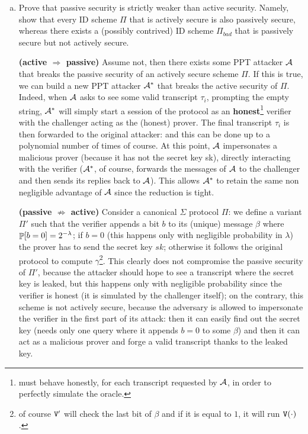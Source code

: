 \begin{enumerate}[(a)]
	\item Prove that passive security is strictly weaker than active security. Namely, show that every ID scheme $\Pi$ that is actively secure is also passively secure, whereas there exists a (possibly contrived) ID scheme $\Pi_{bad}$ that is passively secure but not actively secure.
	
	\begin{solution}
		\textbf{(active $\Rightarrow$ passive)} Assume not, then there exists some PPT attacker $\attacker$ that breaks the passive security of an actively secure scheme $\Pi$. If this is true, we can build a new PPT attacker $\newattacker$ that breaks the active security of $\Pi$. Indeed, when $\attacker$ asks to see some valid transcript $\tau_i$, prompting the empty string, $\newattacker$ will simply start a session of the protocol as an \textbf{honest}\footnote{must behave honestly, for each transcript requested by $\attacker$, in order to perfectly simulate the oracle.} verifier with the challenger acting as the (honest) prover. The final transcript $\tau_i$ is then forwarded to the original attacker: and this can be done up to a polynomial number of times of course. At this point, $\attacker$ impersonates a malicious prover (because it has not the secret key sk), directly interacting with the verifier ($\newattacker$, of course, forwards the messages of $\attacker$ to the challenger and then sends its replies back to $\attacker$). This allows $\newattacker$ to retain the same non negligible advantage of $\attacker$ since the reduction is tight.

		\bigskip
		\textbf{(passive $\not\Rightarrow$ active)} Consider a canonical $\Sigma$ protocol $\Pi$: we define a variant $\Pi'$ such that the verifier appends a bit $b$ to its (unique) message $\beta$ where $\P[b=0] = 2^{-\lambda}$; if $b = 0$ (this happens only with negligible probability in $\lambda$) the prover has to send the secret key $sk$; otherwise it follows the original protocol to compute $\gamma$\footnote{of course $\verifier'$ will check the last bit of $\beta$ and if it is equal to $1$, it will run $\verifier(\cdot)$.}. This clearly does not compromise the passive security of $\Pi'$, because the attacker should hope to see a transcript where the secret key is leaked, but this happens only with negligible probability since the verifier is honest (it is simulated by the challenger itself); on the contrary, this scheme is not actively secure, because the adversary is allowed to impersonate the verifier in the first part of its attack: then it can easily find out the secret key (needs only one query where it appends $b = 0$ to some $\beta$) and then it can act as a malicious prover and forge a valid transcript thanks to the leaked key.
	\end{solution}


\end{enumerate}
